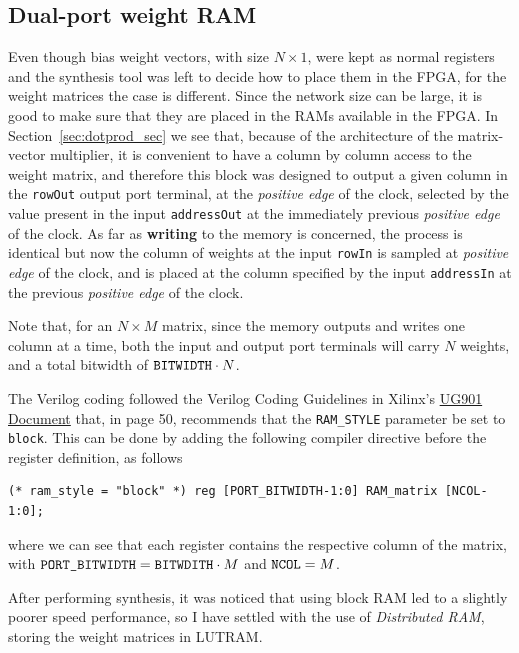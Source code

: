 \subsection{Dual-port weight RAM}
Even though bias weight vectors, with size $N\times 1$, were kept as normal registers and the synthesis tool was left to decide how to place them in the FPGA,
for the weight matrices the case is different. Since the network size can be large, it is good to make sure that they are placed in the RAMs available
in the FPGA. In Section~\ref{sec:dotprod_sec} we see that, because of the architecture of the matrix-vector multiplier, it is convenient to have a column
by column access to the weight matrix, and therefore this block was designed to output a given column in the \verb+rowOut+ output port terminal, at the \emph{positive edge} of
the clock, selected by the value present in the input \verb+addressOut+ at the immediately previous \emph{positive edge} of the clock. As far as \textbf{writing} to
the memory is concerned, the process is identical but now the column of weights at the input \verb+rowIn+ is sampled at \emph{positive edge} of the clock, and is placed
at the column specified by the input \verb+addressIn+ at the previous \emph{positive edge} of the clock.

Note that, for an $N \times M$ matrix, since the memory outputs and writes one column at a time, both the input and output port terminals will carry $N$ weights,
and a total bitwidth of $\verb+BITWIDTH+ \cdot N$.

The Verilog coding followed the Verilog Coding Guidelines in Xilinx's \href{http://www.xilinx.com/support/documentation/sw_manuals/xilinx2015_2/ug901-vivado-synthesis.pdf}{UG901 Document} that,
in page 50, recommends that the \verb+RAM_STYLE+ parameter be set to \verb+block+. This can be done by adding the following compiler directive before the register definition, as follows

\begin{verbatim}
(* ram_style = "block" *) reg [PORT_BITWIDTH-1:0] RAM_matrix [NCOL-1:0];
\end{verbatim}
where we can see that each register contains the respective column of the matrix, with $\verb+PORT_BITWIDTH+ = \verb+BITWDITH+ \cdot M$ and $\verb+NCOL+ = M$.

After performing synthesis, it was noticed that using block RAM led to a slightly poorer speed performance, so I have settled with the use of \emph{Distributed RAM}, storing the weight matrices in LUTRAM.


